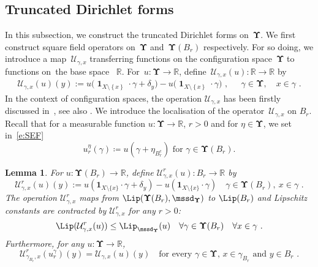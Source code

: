 \documentclass[11pt,letterpaper]{amsart}
\renewcommand{\complement}{\mathrm{c}}
\DeclareMathOperator{\eqdef}{\coloneqq}
\newcommand{\set}[1]{\left\{#1\right\}}							%
\newcommand{\ttonde}[1]{\big({#1}\big)}
\DeclareMathOperator{\car}{\mathbf 1}
\newcommand{\R}{{\mathbb R}}
\newcommand{\comma}{\,\,\mathrm{,}\;\,}
\newcommand{\fstop}{\,\,\mathrm{.}}
\newcommand{\dUpsilon}{{\mathbf \Upsilon}}
\newcommand{\U}{\dUpsilon}
\renewcommand{\1}{\mathbf 1}
\numberwithin{equation}{section}
\theoremstyle{plain}
\newtheorem{lem}[thm]{Lemma}%
\theoremstyle{definition}
\theoremstyle{remark}
\begin{document}
\subsection{Truncated Dirichlet forms}
In this subsection, we construct the truncated Dirichlet forms on~$\U$. 
We first construct square field operators on~$\U$ and~$\U(B_r)$ respectively. For so doing, we introduce a map~$\mathcal U_{\gamma, x}$ transferring functions on the configuration space~$\U$  to functions on~the base space ~$\R$.  For~$u: \U \to \R$, define~$\mathcal U_{\gamma, x}(u): \R \to \R$ by 
\begin{align} \label{d:UO}
\mathcal U_{\gamma, x}(u)(y):=u\ttonde{\car_{X\setminus\set{x}}\cdot\gamma + \delta_y}-u\ttonde{\car_{X\setminus\set{x}}\cdot\gamma} \comma \quad \gamma \in \U,\quad x \in \gamma \fstop
\end{align}
In the context of configuration spaces, the operation $\mathcal U_{\gamma, x}$ has been firstly discussed in~\cite[Lem.~1.2]{MaRoe00}, see also \cite[Lem.~2.16]{LzDSSuz21}.  
 We introduce the localisation of the operator~$\mathcal U_{\gamma, x}$ on $B_r$.  Recall that for a measurable function $ u\colon \dUpsilon\to \R$, $r>0$ and for $\eta \in \dUpsilon$, we set in~\eqref{e:SEF} 
$$\text{$u_{r}^\eta(\gamma)\eqdef  u(\gamma+\eta_{B_r^\complement})$ for $\gamma\in \dUpsilon(B_r)$.}$$
\begin{lem} \label{l:LSO}
For $u: \U(B_r) \to \R$, define  $\mathcal U_{\gamma, x}^r(u): B_r \to \R$ by 
$$\mathcal U_{\gamma, x}^r(u)(y):=u(\1_{X \setminus \{x\}} \cdot \gamma + \delta_y) - u(\1_{X \setminus \{x\}} \cdot \gamma) \quad \gamma \in \U(B_r), \ x \in \gamma \fstop$$
The operation $\mathcal U^r_{\gamma, x}$ maps from $\Lip(\U(B_r), \mssd_\U)$ to $\Lip(B_r)$ and Lipschitz constants are contracted by $\mathcal U^r_{\gamma, x}$ for any $r>0$:
 $$\Lip(\mathcal U^r_{\gamma, x}(u)) \le \Lip_{\mssd_\U}(u) \quad \forall \gamma \in \U(B_r) \quad \forall x \in \gamma \fstop$$
Furthermore, for any $u:  \U \to \R$, 
$$\mathcal U_{\gamma_{B_r}, x}^r(u_{r}^\gamma)(y) = \mathcal U_{\gamma, x}(u)(y) \quad \text{for every $\gamma \in \U$, $x \in \gamma_{B_r}$ and $y \in B_r$} \fstop$$
\end{lem}
\end{document}
